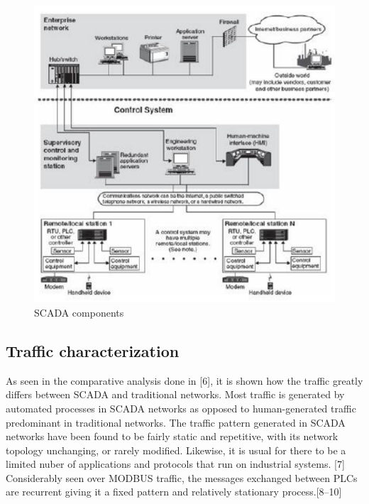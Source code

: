 \documentclass[12pt,]{article}
\begin{document}
\begin{figure}

{\centering \includegraphics{thesis_files/figure-latex/unnamed-chunk-4-1} 

}

\caption{SCADA components}\label{fig:unnamed-chunk-4}
\end{figure}

\subsection{Traffic characterization}\label{traffic-characterization}

As seen in the comparative analysis done in {[}6{]}, it is shown how the
traffic greatly differs between SCADA and traditional networks. Most
traffic is generated by automated processes in SCADA networks as opposed
to human-generated traffic predominant in traditional networks. The
traffic pattern generated in SCADA networks have been found to be fairly
static and repetitive, with its network topology unchanging, or rarely
modified. Likewise, it is usual for there to be a limited nuber of
applications and protocols that run on industrial systems. {[}7{]}
Considerably seen over MODBUS traffic, the messages exchanged between
PLCs are recurrent giving it a fixed pattern and relatively stationary
process.{[}8--10{]}
\end{document}
